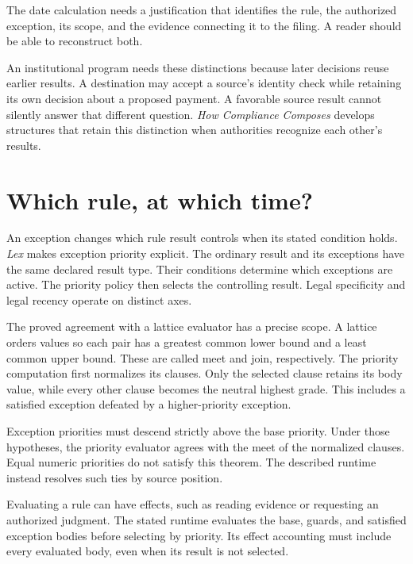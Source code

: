 \documentclass{momentum}
\begin{document}
The date calculation needs a justification that identifies the rule, the authorized exception, its scope, and the evidence connecting it to the filing. A reader should be able to reconstruct both.

An institutional program needs these distinctions because later decisions reuse earlier results. A destination may accept a source's identity check while retaining its own decision about a proposed payment. A favorable source result cannot silently answer that different question. \emph{How Compliance Composes} develops structures that retain this distinction when authorities recognize each other's results. \cite[Section~1]{composes}

\section{Which rule, at which time?}

An exception changes which rule result controls when its stated condition holds. \emph{Lex} makes exception priority explicit. The ordinary result and its exceptions have the same declared result type. Their conditions determine which exceptions are active. The priority policy then selects the controlling result. Legal specificity and legal recency operate on distinct axes. \cite[Sections~3.1 and~4.4]{lex}

The proved agreement with a lattice evaluator has a precise scope. A lattice orders values so each pair has a greatest common lower bound and a least common upper bound. These are called meet and join, respectively. The priority computation first normalizes its clauses. Only the selected clause retains its body value, while every other clause becomes the neutral highest grade. This includes a satisfied exception defeated by a higher-priority exception.

Exception priorities must descend strictly above the base priority. Under those hypotheses, the priority evaluator agrees with the meet of the normalized clauses. Equal numeric priorities do not satisfy this theorem. The described runtime instead resolves such ties by source position. \cite[Section~7.4, priority evaluator agreement]{lex}

Evaluating a rule can have effects, such as reading evidence or requesting an authorized judgment. The stated runtime evaluates the base, guards, and satisfied exception bodies before selecting by priority. Its effect accounting must include every evaluated body, even when its result is not selected. \cite[Sections~3.1 and~4.3]{lex}
\end{document}
